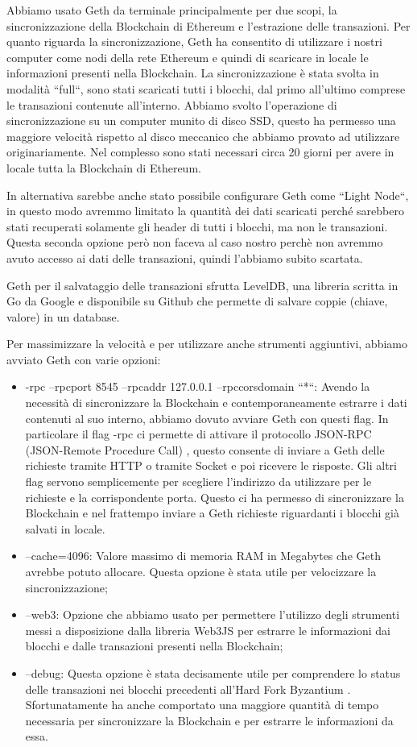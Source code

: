 \documentclass[12pt]{report}
\begin{document}
Abbiamo usato Geth da terminale principalmente per due scopi, la sincronizzazione della Blockchain di Ethereum e l'estrazione delle transazioni.
Per quanto riguarda la sincronizzazione, Geth ha consentito di utilizzare i nostri computer come nodi della rete Ethereum e quindi di scaricare in locale le informazioni presenti nella Blockchain.
La sincronizzazione è stata svolta in modalità ``full``, sono stati scaricati tutti i blocchi, dal primo all'ultimo comprese le transazioni contenute all'interno.
Abbiamo svolto l'operazione di sincronizzazione su un computer munito di disco SSD, questo ha permesso una maggiore velocità rispetto al disco meccanico che abbiamo provato ad utilizzare originariamente. Nel complesso sono stati necessari circa 20 giorni per avere in locale tutta la Blockchain di Ethereum.

In alternativa sarebbe anche stato possibile configurare Geth come ``Light Node``, in questo modo avremmo limitato la quantità dei dati scaricati perché sarebbero stati recuperati solamente gli header di tutti i blocchi, ma non le transazioni. Questa seconda opzione però non faceva al caso nostro perchè non avremmo avuto accesso ai dati delle transazioni, quindi l'abbiamo subito scartata.

Geth per il salvataggio delle transazioni sfrutta LevelDB, una libreria scritta in Go da Google e disponibile su Github \cite{LevelDB} che permette di salvare coppie (chiave, valore) in un database.

Per massimizzare la velocità e per utilizzare anche strumenti aggiuntivi, abbiamo avviato Geth con varie opzioni:
\begin{itemize}
\item -rpc --rpcport 8545 --rpcaddr 127.0.0.1 --rpccorsdomain ``*``: Avendo la necessità di sincronizzare la Blockchain e contemporaneamente estrarre i dati contenuti al suo interno, abbiamo dovuto avviare Geth con questi flag. 
In particolare il flag -rpc ci permette di attivare il protocollo JSON-RPC (JSON-Remote Procedure Call) \cite{JSONRPC}, questo consente di inviare a Geth delle richieste tramite HTTP o tramite Socket e poi ricevere le risposte. Gli altri flag servono semplicemente per scegliere l'indirizzo da utilizzare per le richieste e la corrispondente porta.
Questo ci ha permesso di sincronizzare la Blockchain e nel frattempo inviare a Geth richieste riguardanti i blocchi già salvati in locale.
\item --cache=4096: Valore massimo di memoria RAM in Megabytes che Geth avrebbe potuto allocare. Questa opzione è stata utile per velocizzare la sincronizzazione;
\item --web3: Opzione che abbiamo usato per permettere l'utilizzo degli strumenti messi a disposizione dalla libreria Web3JS per estrarre le informazioni dai blocchi e dalle transazioni presenti nella Blockchain;
\item --debug: Questa opzione è stata decisamente utile per comprendere lo status delle transazioni nei blocchi precedenti all'Hard Fork Byzantium \cite{Byzantium}. Sfortunatamente ha anche comportato una maggiore quantità di tempo necessaria per sincronizzare la Blockchain e per estrarre le informazioni da essa.
\end{itemize}
\end{document}
